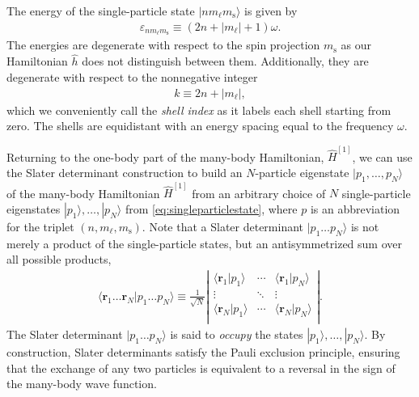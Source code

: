 The energy of the single-particle state $|n m_\ell m_{\mathrm{s}}\rangle$ is given by
\begin{align} \label{eq:energysingleparticlestate}
  \varepsilon_{n m_\ell m_{\mathrm{s}}} \equiv (2 n + |m_\ell| + 1) \omega.
\end{align}
The energies are degenerate with respect to the spin projection $m_{\mathrm{s}}$ as our Hamiltonian $\hat{h}$ does not distinguish between them.  Additionally, they are degenerate with respect to the nonnegative integer
\begin{align} \label{eq:shell_index}
  k \equiv 2 n + |m_\ell|,
\end{align}
which we conveniently call the \textit{shell index} as it labels each
shell starting from zero.  The shells are equidistant with an energy
spacing equal to the frequency $\omega$.

Returning to the one-body part of the many-body Hamiltonian,
$\hat{H}^{[1]}$, we can use the Slater determinant construction to
build an $N$-particle eigenstate $|p_1, \ldots, p_N\rangle$ of the
many-body Hamiltonian $\hat{H}^{[1]}$ from an arbitrary choice of $N$
single-particle eigenstates $|p_1\rangle, \ldots, |p_N\rangle$
from \eqref{eq:singleparticlestate}, where $p$ is an abbreviation for
the triplet $(n, m_\ell, m_{\mathrm{s}})$.  Note that a Slater
determinant $|p_1 \ldots p_N\rangle$ is not merely a product of the
single-particle states, but an antisymmetrized sum over all possible
products,
\begin{align*}
  \langle \bm{r}_1 \ldots \bm{r}_N | p_1 \ldots p_N \rangle \equiv
  \frac{1}{\sqrt{N}} \left|
  \begin{matrix}
    \langle \bm{r}_1 | p_1 \rangle & \cdots & \langle \bm{r}_1 | p_N \rangle \\
    \vdots & \ddots & \vdots \\
    \langle \bm{r}_N | p_1 \rangle & \cdots & \langle \bm{r}_N | p_N \rangle \\
  \end{matrix}
  \right|.
\end{align*}
The Slater determinant $|p_1 \ldots p_N\rangle$ is said
to \textit{occupy} the states $|p_1\rangle, \ldots, |p_N\rangle$.  By
construction, Slater determinants satisfy the Pauli exclusion
principle, ensuring that the exchange of any two particles is
equivalent to a reversal in the sign of the many-body wave function.

